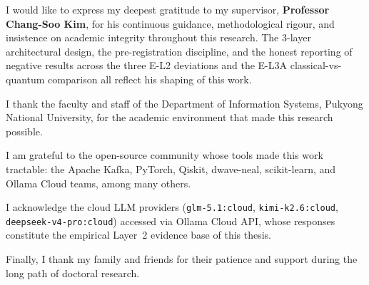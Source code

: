 
\noindent
I would like to express my deepest gratitude to my supervisor, \textbf{Professor Chang-Soo Kim}, for his continuous guidance, methodological rigour, and insistence on academic integrity throughout this research. The 3-layer architectural design, the pre-registration discipline, and the honest reporting of negative results across the three E-L2 deviations and the E-L3A classical-vs-quantum comparison all reflect his shaping of this work.

I thank the faculty and staff of the Department of Information Systems, Pukyong National University, for the academic environment that made this research possible.

I am grateful to the open-source community whose tools made this work tractable: the Apache Kafka, PyTorch, Qiskit, dwave-neal, scikit-learn, and Ollama Cloud teams, among many others.

I acknowledge the cloud LLM providers (\texttt{glm-5.1:cloud}, \texttt{kimi-k2.6:cloud}, \texttt{deepseek-v4-pro:cloud}) accessed via Ollama Cloud API, whose responses constitute the empirical Layer~2 evidence base of this thesis.

Finally, I thank my family and friends for their patience and support during the long path of doctoral research.
